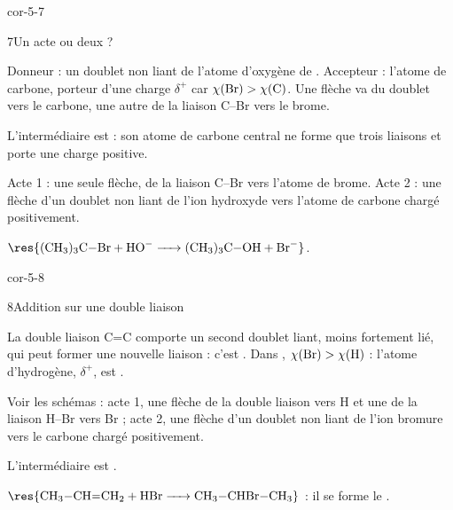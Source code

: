 \begin{blocLivre}{cor-5-7}
\begin{corrige}{7}{Un acte ou deux ?}
\begin{questions}
\item Donneur : un doublet non liant de l'atome d'oxygène de . Accepteur : l'atome de carbone, porteur d'une
charge $\delta^+$ car $\chi(\ce{Br})>\chi(\ce{C})$. Une flèche va du doublet vers le carbone, une autre de la liaison
C--Br vers le brome.
\item L'intermédiaire est   : son atome de carbone central ne forme que trois
liaisons et porte une charge positive.
\item Acte 1 : une seule flèche, de la liaison C--Br vers l'atome de brome. Acte 2 : une flèche d'un doublet non liant
de l'ion hydroxyde vers l'atome de carbone chargé positivement.
\item $\res{\ce{(CH3)3C-Br + HO- -> (CH3)3C-OH + Br-}}$.
\end{questions}
\end{corrige}
\end{blocLivre}
\begin{blocLivre}{cor-5-8}
\begin{corrige}{8}{Addition sur une double liaison}
\begin{questions}
\item La double liaison C=C comporte un second doublet liant, moins fortement lié, qui peut former une nouvelle
liaison : c'est . Dans , $\chi(\ce{Br})>\chi(\ce{H})$ : l'atome d'hydrogène, $\delta^+$,
est .
\item Voir les schémas : acte 1, une flèche de la double liaison vers H et une de la liaison H--Br vers Br ;
acte 2, une flèche d'un doublet non liant de l'ion bromure vers le carbone chargé positivement.
\item L'intermédiaire est  .
\item $\res{\ce{CH3-CH=CH2 + HBr -> CH3-CHBr-CH3}}$ : il se forme le .
\end{questions}
\end{corrige}
\end{blocLivre}
